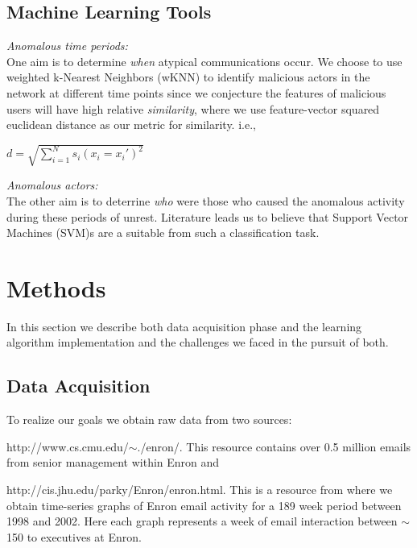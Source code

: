 \documentclass[11pt,letterpaper]{article}
\begin{document}
\subsection{Machine Learning Tools}
\hspace*{10pt}\textit{Anomalous time periods:} \\
One aim is to determine \textit{when} atypical communications occur. We choose to
use weighted k-Nearest Neighbors (wKNN) to identify malicious actors in the network
at different time points since we conjecture the features of malicious users will
have high relative \textit{similarity}, where we use feature-vector squared euclidean distance
as our metric for similarity. i.e.,

$d = \sqrt{\sum\limits_{i=1}^N s_i (x_i = x_i')^2 }$


\textit{Anomalous actors:} \\
The other aim is to deterrine \textit{who} were those who caused the anomalous
activity during these periods of unrest. Literature \cite{shon2007hybrid,shon2005machine}
leads us to believe that Support Vector Machines (SVM)s are a suitable from such 
a classification task. 


\section{Methods}
In this section we describe both data acquisition phase and the learning algorithm
implementation and the challenges we faced in the pursuit of both.

\subsection{Data Acquisition}
To realize our goals we obtain raw data from two sources:
\begin{inparaenum}[\itshape(i)]
\item http://www.cs.cmu.edu/$\sim$./enron/. This resource contains over 0.5 million
emails from senior management within Enron and 
\item http://cis.jhu.edu/parky/Enron/enron.html. This is a resource from where we obtain
time-series graphs of Enron email activity for a 189 week period between 1998 and 2002.
Here each graph represents a week of email interaction between $\sim$150 to executives
at Enron.
\end{inparaenum}
\end{document}

